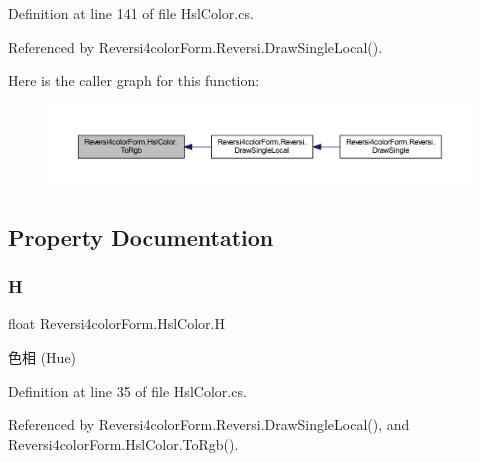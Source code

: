 Definition at line 141 of file Hsl\+Color.\+cs.



Referenced by Reversi4color\+Form.\+Reversi.\+Draw\+Single\+Local().

Here is the caller graph for this function\+:\nopagebreak
\begin{figure}[H]
\begin{center}
\leavevmode
\includegraphics[width=350pt]{class_reversi4color_form_1_1_hsl_color_adc8d6bd6fd29eff44ccc1f2d1890fd72_icgraph}
\end{center}
\end{figure}


\subsection{Property Documentation}
\mbox{\label{class_reversi4color_form_1_1_hsl_color_a87a714cc5aa0034da10a51e6ebac4c16}} 
\subsubsection{\texorpdfstring{H}{H}}
{\footnotesize\ttfamily float Reversi4color\+Form.\+Hsl\+Color.\+H\hspace{0.3cm}{\ttfamily [get]}}



色相 (Hue) 



Definition at line 35 of file Hsl\+Color.\+cs.



Referenced by Reversi4color\+Form.\+Reversi.\+Draw\+Single\+Local(), and Reversi4color\+Form.\+Hsl\+Color.\+To\+Rgb().

\mbox{\label{class_reversi4color_form_1_1_hsl_color_a5d138402c61ef3bae7abe2c9c6d765dd}} 
